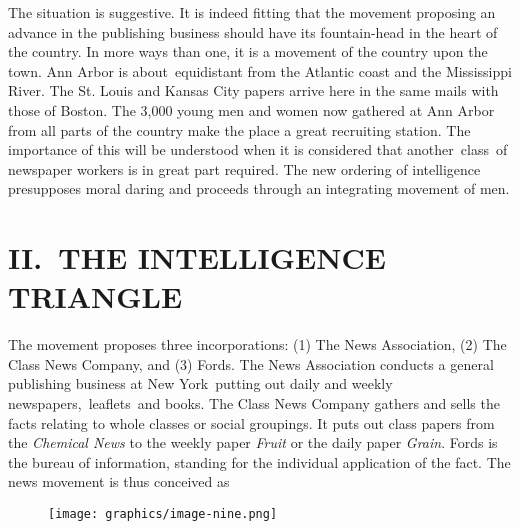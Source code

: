 \documentclass[openany,nobib]{tufte-book}
\begin{document}
The situation is suggestive. It is indeed fitting that the movement
proposing an advance in the publishing business should have its
fountain-head in the heart of the country. In more ways than one, it is
a movement of the country upon the town. Ann Arbor is about~equidistant
from the Atlantic coast and the Mississippi River. The St. Louis and
Kansas City papers arrive here in the same mails with those of Boston.
The 3,000 young men and women now gathered at Ann Arbor from all parts
of the country make the place a great recruiting station. The importance
of this will be understood when it is considered that another~class~of
newspaper workers is in great part required. The new ordering of
intelligence presupposes moral daring and proceeds through an
integrating movement of men.

\hypertarget{ii-the-intelligence-triangle}{%
\section{II.~THE INTELLIGENCE
TRIANGLE}\label{ii-the-intelligence-triangle}}

The movement proposes three incorporations: (1) The News Association,
(2) The Class News Company, and (3) Fords. The News Association conducts
a general publishing business at New York~putting out daily and weekly
newspapers,~leaflets~and books. The Class News Company gathers and sells
the facts relating to whole classes or social groupings. It puts out
class papers from the \emph{Chemical News} to the weekly paper
\emph{Fruit} or the daily paper \emph{Grain}. Fords is the bureau of
information, standing for the individual application of the fact. The
news movement is thus conceived as~


\begin{figure}
   \texttt{[image: graphics/image-nine.png]}
   \label{fig:fig3}
\end{figure}
\end{document}
